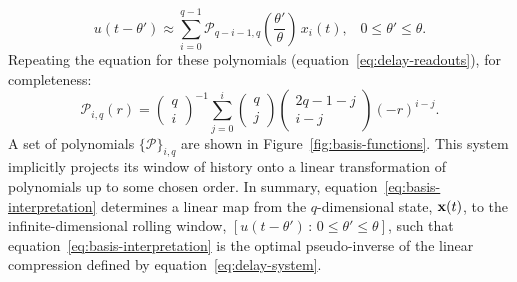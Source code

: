 \begin{equation} \label{eq:basis-interpretation}
u(t - \theta') \approx \sum_{i=0}^{q-1} \mathcal{P}_{q-i-1,q} \left(\frac{\theta'}{\theta} \right) \, x_{i}(t) \text{,} \quad 0 \le \theta' \le \theta \text{.} 
\end{equation}
Repeating the equation for these polynomials (equation~\ref{eq:delay-readouts}), for completeness:
\begin{equation} \label{eq:basis-functions}
\mathcal{P}_{i,q}(r) = \begin{pmatrix}q \\ i\end{pmatrix}^{-1} \sum_{j=0}^i \begin{pmatrix}q \\ j\end{pmatrix} \begin{pmatrix}2q - 1 - j \\ i - j\end{pmatrix} \left( -r \right)^{i - j} \text{.} %
\end{equation}
A set of polynomials $\{ \mathcal{P} \}_{i, q}$ are shown in Figure~\ref{fig:basis-functions}.
This system implicitly projects its window of history onto a linear transformation of polynomials up to some chosen order.
In summary, equation~\ref{eq:basis-interpretation} determines a linear map from the $q$-dimensional state, $\mathbf{x}(t)$, to the infinite-dimensional rolling window, $[ u(t - \theta') \,:\, 0 \le \theta' \le \theta ]$, such that equation~\ref{eq:basis-interpretation} is the optimal pseudo-inverse of the linear compression defined by equation~\ref{eq:delay-system}.


